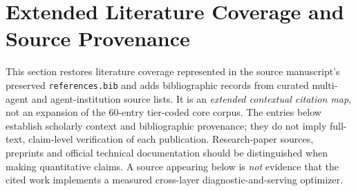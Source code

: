\section{Extended Literature Coverage and Source Provenance}
\label{app:lit_coverage}
This section restores literature coverage represented in the source manuscript's
preserved \texttt{references.bib} and adds bibliographic records from curated
multi-agent and agent-institution source lists. It is an \emph{extended contextual
citation map}, not an expansion of the 60-entry tier-coded core corpus.
The entries below establish scholarly context and bibliographic provenance;
they do not imply full-text, claim-level verification of each publication.
Research-paper sources, preprints and official technical documentation should
be distinguished when making quantitative claims. A source appearing below is
\emph{not} evidence that the cited work implements a measured cross-layer
diagnostic-and-serving optimizer.

